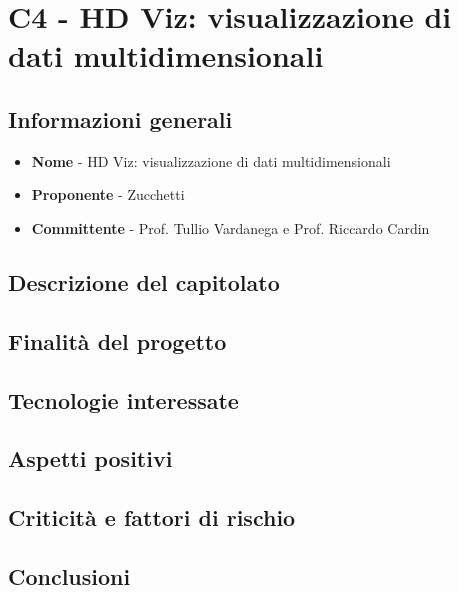 \chapter{C4 - HD Viz: visualizzazione di dati multidimensionali}
\section{Informazioni generali}
\begin{itemize}
	\item \textbf{Nome} - HD Viz: visualizzazione di dati multidimensionali
	\item \textbf{Proponente} - Zucchetti
	\item \textbf{Committente} - Prof. Tullio Vardanega e Prof. Riccardo Cardin
\end{itemize}
\section{Descrizione del capitolato}
\section{Finalità del progetto}
\section{Tecnologie interessate}
\section{Aspetti positivi}
\section{Criticità e fattori di rischio}
\section{Conclusioni}